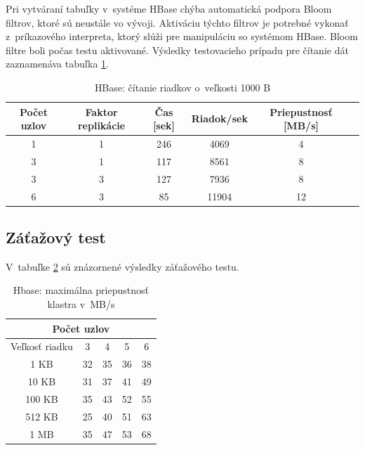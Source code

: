 \documentclass[11pt,twoside,a4paper]{book}
\begin{document}
Pri vytváraní tabuľky v~systéme HBase chýba automatická podpora Bloom filtrov, ktoré sú neustále vo vývoji. Aktiváciu týchto filtrov je potrebné vykonať z~príkazového interpreta, ktorý slúži pre manipuláciu so systémom HBase. Bloom filtre boli počas testu aktivované. Výsledky testovacieho prípadu pre čítanie dát zaznamenáva tabuľka \ref{tab:HPerf2}.

\begin{table}[hp]
\begin{center}
\begin{tabular}{|c|c|c|c|c|c|}

\hline Počet uzlov & Faktor replikácie & Čas [sek] & Riadok/sek & Priepustnosť [MB/s]\\ 
\hline
\hline 1 & 1 & 246 & 4069 & 4\\ 
\hline 3 & 1 & 117 & 8561 & 8\\ 
\hline 3 & 3 & 127 & 7936 & 8\\ 
\hline 6 & 3 & 85 & 11904 & 12\\ 
\hline
\end{tabular} 
\end{center}
\caption{HBase: čítanie riadkov o~veľkosti 1000 B}
\label{tab:HPerf2}
\end{table}

\subsection*{Záťažový test}

V~tabuľke \ref{tab:HPerf3} sú znázornené výsledky záťažového testu.

\begin{table}[htp]
\begin{center}
\begin{tabular}{|c|c|c|c|c|}
\hline
\multicolumn{5}{|c|}{Počet uzlov}  \\
\hline Veľkosť riadku & 3 & 4 & 5 & 6\\ 
\hline
\hline 1 KB & 32 & 35 & 36 & 38\\ 
\hline 10 KB & 31 & 37 & 41 & 49 \\ 
\hline 100 KB & 35 & 43 & 52 & 55\\ 
\hline 512 KB & 25 & 40 & 51 & 63 \\  
\hline 1 MB & 35 & 47 & 53 & 68 \\ 
\hline
\end{tabular} 
\end{center}
\caption{Hbase: maximálna priepustnosť klastra v~MB/s}
\label{tab:HPerf3}
\end{table}
\end{document}
